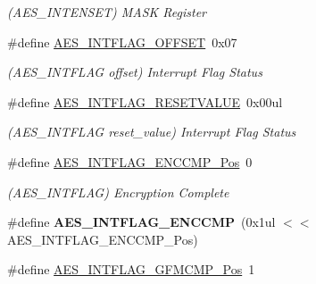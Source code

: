\begin{DoxyCompactItemize}
\begin{DoxyCompactList}\small\item\em (A\+E\+S\+\_\+\+I\+N\+T\+E\+N\+S\+E\+T) M\+A\+S\+K Register \end{DoxyCompactList}\item 
\hypertarget{group___s_a_m_l21___a_e_s_ga608bb8f3da491602172f6599ca53e82f}{}\#define \hyperlink{group___s_a_m_l21___a_e_s_ga608bb8f3da491602172f6599ca53e82f}{A\+E\+S\+\_\+\+I\+N\+T\+F\+L\+A\+G\+\_\+\+O\+F\+F\+S\+E\+T}~0x07\label{group___s_a_m_l21___a_e_s_ga608bb8f3da491602172f6599ca53e82f}

\begin{DoxyCompactList}\small\item\em (A\+E\+S\+\_\+\+I\+N\+T\+F\+L\+A\+G offset) Interrupt Flag Status \end{DoxyCompactList}\item 
\hypertarget{group___s_a_m_l21___a_e_s_gaaf1ed5becb953ddbe6047832971a78d1}{}\#define \hyperlink{group___s_a_m_l21___a_e_s_gaaf1ed5becb953ddbe6047832971a78d1}{A\+E\+S\+\_\+\+I\+N\+T\+F\+L\+A\+G\+\_\+\+R\+E\+S\+E\+T\+V\+A\+L\+U\+E}~0x00ul\label{group___s_a_m_l21___a_e_s_gaaf1ed5becb953ddbe6047832971a78d1}

\begin{DoxyCompactList}\small\item\em (A\+E\+S\+\_\+\+I\+N\+T\+F\+L\+A\+G reset\+\_\+value) Interrupt Flag Status \end{DoxyCompactList}\item 
\hypertarget{group___s_a_m_l21___a_e_s_ga275779488d387fbd93b7b368e148caa6}{}\#define \hyperlink{group___s_a_m_l21___a_e_s_ga275779488d387fbd93b7b368e148caa6}{A\+E\+S\+\_\+\+I\+N\+T\+F\+L\+A\+G\+\_\+\+E\+N\+C\+C\+M\+P\+\_\+\+Pos}~0\label{group___s_a_m_l21___a_e_s_ga275779488d387fbd93b7b368e148caa6}

\begin{DoxyCompactList}\small\item\em (A\+E\+S\+\_\+\+I\+N\+T\+F\+L\+A\+G) Encryption Complete \end{DoxyCompactList}\item 
\hypertarget{group___s_a_m_l21___a_e_s_ga5b4f69fe874307e8054c5c508ca07f91}{}\#define {\bfseries A\+E\+S\+\_\+\+I\+N\+T\+F\+L\+A\+G\+\_\+\+E\+N\+C\+C\+M\+P}~(0x1ul $<$$<$ A\+E\+S\+\_\+\+I\+N\+T\+F\+L\+A\+G\+\_\+\+E\+N\+C\+C\+M\+P\+\_\+\+Pos)\label{group___s_a_m_l21___a_e_s_ga5b4f69fe874307e8054c5c508ca07f91}

\item 
\hypertarget{group___s_a_m_l21___a_e_s_ga331dfca6188312fceed2ee7acd16a184}{}\#define \hyperlink{group___s_a_m_l21___a_e_s_ga331dfca6188312fceed2ee7acd16a184}{A\+E\+S\+\_\+\+I\+N\+T\+F\+L\+A\+G\+\_\+\+G\+F\+M\+C\+M\+P\+\_\+\+Pos}~1\label{group___s_a_m_l21___a_e_s_ga331dfca6188312fceed2ee7acd16a184}


\end{DoxyCompactItemize}
